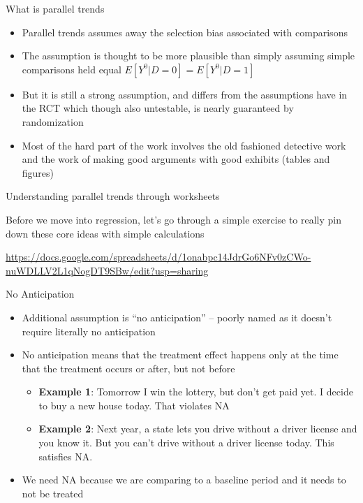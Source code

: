 \documentclass{beamer}
\begin{document}
\begin{frame}{What is parallel trends}

\begin{itemize}
\item Parallel trends assumes away the selection bias associated with comparisons
\item The assumption is thought to be more plausible than simply assuming simple comparisons held equal $E[Y^0|D=0]=E[Y^0|D=1]$
\item But it is still a strong assumption, and differs from the assumptions have in the RCT which though also untestable, is nearly guaranteed by randomization
\item Most of the hard part of the work involves the old fashioned detective work and the work of making good arguments with good exhibits (tables and figures)
\end{itemize}

\end{frame}



\begin{frame}{Understanding parallel trends through worksheets}

Before we move into regression, let's go through a simple exercise to really pin down these core ideas with simple calculations

\bigskip 

\url{https://docs.google.com/spreadsheets/d/1onabpc14JdrGo6NFv0zCWo-nuWDLLV2L1qNogDT9SBw/edit?usp=sharing}

\end{frame}


\begin{frame}{No Anticipation}

\begin{itemize}
\item Additional assumption is ``no anticipation'' -- poorly named as it doesn't require literally no anticipation
\item No anticipation means that the treatment effect happens only at the time that the treatment occurs or after, but not before
	\begin{itemize}
	\item \textbf{Example 1}: Tomorrow I win the lottery, but don't get paid yet. I decide to buy a new house today. That violates NA
	\item \textbf{Example 2}: Next year, a state lets you drive without a driver license and you know it. But you can't drive without a driver license today.  This satisfies NA.
	\end{itemize}
\item We need NA because we are comparing to a baseline period and it needs to not be treated
\end{itemize}

\end{frame}
\end{document}
